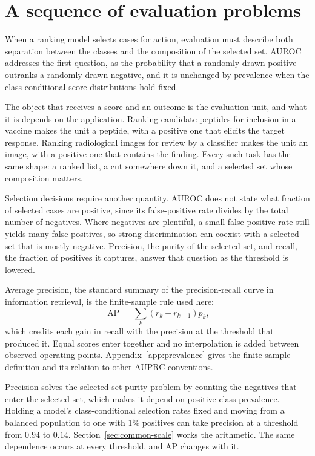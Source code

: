 \documentclass[11pt]{article}
\newcommand{\AP}{\operatorname{AP}}
\theoremstyle{remark}
\begin{document}
\begingroup
\small
\setlength{\parskip}{0pt}
\tableofcontents
\endgroup
\newpage

\section{A sequence of evaluation problems}
\label{sec:problems}

When a ranking model selects cases for action, evaluation must describe both separation between the classes and the composition of the selected set. AUROC addresses the first question, as the probability that a randomly drawn positive outranks a randomly drawn negative, and it is unchanged by prevalence when the class-conditional score distributions hold fixed.

The object that receives a score and an outcome is the evaluation unit, and what it is depends on the application. Ranking candidate peptides for inclusion in a vaccine makes the unit a peptide, with a positive one that elicits the target response. Ranking radiological images for review by a classifier makes the unit an image, with a positive one that contains the finding. Every such task has the same shape: a ranked list, a cut somewhere down it, and a selected set whose composition matters.

Selection decisions require another quantity. AUROC does not state what fraction of selected cases are positive, since its false-positive rate divides by the total number of negatives. Where negatives are plentiful, a small false-positive rate still yields many false positives, so strong discrimination can coexist with a selected set that is mostly negative. Precision, the purity of the selected set, and recall, the fraction of positives it captures, answer that question as the threshold is lowered.

Average precision, the standard summary of the precision-recall curve in information retrieval, is the finite-sample rule used here:
\[
\AP
=
\sum_k (r_k-r_{k-1})p_k,
\]
which credits each gain in recall with the precision at the threshold that produced it. Equal scores enter together and no interpolation is added between observed operating points. Appendix~\ref{app:prevalence} gives the finite-sample definition and its relation to other AUPRC conventions.

Precision solves the selected-set-purity problem by counting the negatives that enter the selected set, which makes it depend on positive-class prevalence. Holding a model's class-conditional selection rates fixed and moving from a balanced population to one with $1\%$ positives can take precision at a threshold from $0.94$ to $0.14$. Section~\ref{sec:common-scale} works the arithmetic. The same dependence occurs at every threshold, and AP changes with it.
\end{document}

